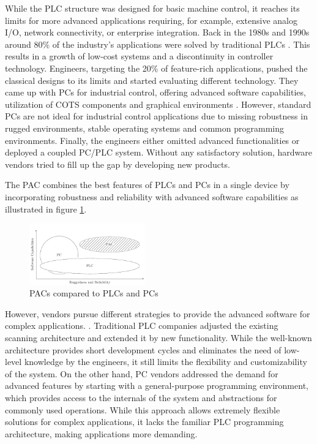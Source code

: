 While the \ac{PLC} structure was designed for basic machine control, it
reaches its limits for more advanced applications requiring, for example,
extensive analog I/O, network connectivity, or enterprise integration. Back in
the 1980s and 1990s around 80\% of the industry's applications were solved by
traditional \acp{PLC} \citep{bel05}. This results in a growth of low-cost
systems and a discontinuity in controller technology. Engineers, targeting the
20\% of feature-rich applications, pushed the classical designs to its limits
and started evaluating different technology. They came up with \acp{PC} for
industrial control, offering advanced software capabilities, utilization of
\ac{COTS} components and graphical environments \citep{bel05}. However,
standard \acp{PC} are not ideal for industrial control applications due to
missing robustness in rugged environments, stable operating systems and common
programming environments. Finally, the engineers either omitted advanced
functionalities or deployed a coupled \ac{PC}/\ac{PLC} system. Without any
satisfactory solution, hardware vendors tried to fill up the gap by developing
new products.

The \ac{PAC} combines the best features of \acp{PLC} and \acp{PC} in a single
device by incorporating robustness and reliability with advanced software
capabilities as illustrated in figure \ref{fig:pac}.
\begin{figure}
	\centering
	\includegraphics[width=5cm]{../figures/pac}
	\caption{\acsp{PAC} compared to \acsp{PLC} and \acsp{PC} \citep[adapted from][]{bel05}}
	\label{fig:pac}
\end{figure}
However, vendors pursue different strategies to provide the advanced software
for complex applications. \citep{bel05}. Traditional \ac{PLC} companies
adjusted the existing scanning architecture and extended it by new
functionality. While the well-known architecture provides short development
cycles and eliminates the need of low-level knowledge by the engineers, it
still limits the flexibility and customizability of the system. On the other
hand, \ac{PC} vendors addressed the demand for advanced features by starting
with a general-purpose programming environment, which provides access to the
internals of the system and abstractions for commonly used operations. While
this approach allows extremely flexible solutions for complex applications, it
lacks the familiar \ac{PLC} programming architecture, making applications more
demanding.

